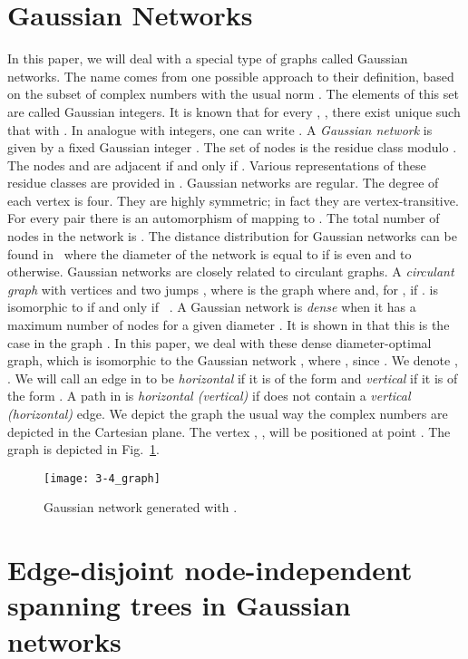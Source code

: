\documentclass[12pt,journal,compsoc,onecolumn,]{IEEEtran}
\begin{document}
{\section{Gaussian Networks\label{SectionGaussNet}}

In this paper, we will deal with a special type of graphs called Gaussian networks. The
name comes from one possible approach to their definition, based on the subset
of complex numbers  with the usual norm . The elements of this set are called
Gaussian integers. It is known that for every , , there exist unique  such that  with . In analogue with integers, one can write
.  A \textsl{Gaussian network}
 is given by a fixed Gaussian
integer . The set of nodes is the residue class modulo .
The nodes  and  are adjacent if and only if .
Various representations of these residue classes are provided in \cite{JordanPotratz}.
Gaussian networks are regular. The degree of each vertex is four. They are
highly symmetric; in fact they are vertex-transitive.
For every pair  there is an automorphism of  mapping
 to . The total number of nodes in the network  is . The distance distribution for Gaussian
networks can be found in~\cite{10.1109/TC.2008.57} where the diameter of the
network  is equal to  if  is even and to  otherwise. Gaussian networks are
closely related to circulant graphs. A \textsl{circulant graph} with 
vertices and two jumps , where  is the graph
 where  and, for ,  if
.
 is isomorphic to  if and
only if ~\cite{10.1109/TC.2008.57}. A Gaussian
network is \textsl{dense} when it has a maximum number of nodes for a given
diameter . It is shown in \cite{Beivide:1991:ODN:123467.123483} that this
is the case in the graph . In this paper, we deal with these dense
diameter-optimal graph, which is isomorphic to the Gaussian network , where
, since .
We denote , .
We will call an
edge in  to be \textsl{horizontal} if it is of the form  and
\textsl{vertical} if it is of the form .
A path in  is \textsl{horizontal (vertical)} if does not contain a \textsl{vertical (horizontal)} edge.
We depict the graph  the
usual way the complex numbers are depicted in the Cartesian plane. The vertex
, ,
will be positioned at point . The graph
 is depicted in Fig.~\ref{34graph}.


\begin{figure}[H]
\centering
\texttt{[image: 3-4\_graph]} \caption{Gaussian network generated with .}\label{34graph}\end{figure} 
\section{Edge-disjoint node-independent spanning trees in Gaussian
networks\label{SectionEDNIST}}

}
\end{document}
